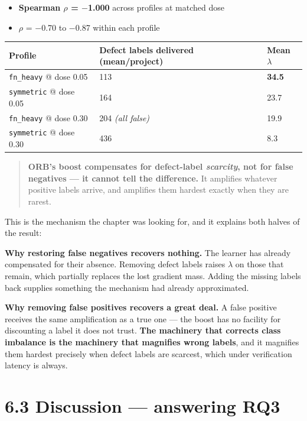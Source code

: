 \begin{itemize}
\tightlist
\item
  \textbf{Spearman \ensuremath{\rho} = \ensuremath{-}1.000} across profiles at matched dose
\item
  \ensuremath{\rho} = \ensuremath{-}0.70 to \ensuremath{-}0.87 within each profile
\end{itemize}

\begin{longtable}[]{@{}lll@{}}
\toprule\noalign{}
Profile & Defect labels delivered (mean/project) & Mean \ensuremath{\lambda} \\
\midrule\noalign{}
\endhead
\bottomrule\noalign{}
\endlastfoot
\texttt{fn\_heavy} @ dose 0.05 & 113 & \textbf{34.5} \\
\texttt{symmetric} @ dose 0.05 & 164 & 23.7 \\
\texttt{fn\_heavy} @ dose 0.30 & 204 \emph{(all false)} & 19.9 \\
\texttt{symmetric} @ dose 0.30 & 436 & 8.3 \\
\end{longtable}

\begin{quote}
\textbf{ORB's boost compensates for defect-label \emph{scarcity}, not
for false negatives --- it cannot tell the difference.} It amplifies
whatever positive labels arrive, and amplifies them hardest exactly when
they are rarest.
\end{quote}

This is the mechanism the chapter was looking for, and it explains both
halves of the result:

\textbf{Why restoring false negatives recovers nothing.} The learner has
already compensated for their absence. Removing defect labels raises \ensuremath{\lambda}
on those that remain, which partially replaces the lost gradient mass.
Adding the missing labels back supplies something the mechanism had
already approximated.

\textbf{Why removing false positives recovers a great deal.} A false
positive receives the same amplification as a true one --- the boost has
no facility for discounting a label it does not trust. \textbf{The
machinery that corrects class imbalance is the machinery that magnifies
wrong labels}, and it magnifies them hardest precisely when defect
labels are scarcest, which under verification latency is always.

\section{6.3 Discussion --- answering
RQ3}\label{discussion-answering-rq3}

